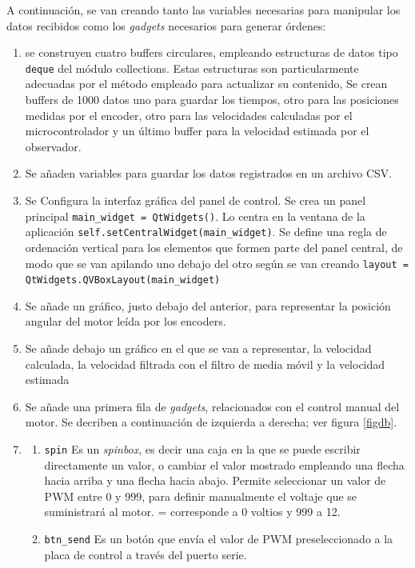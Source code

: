 A continuación, se van creando tanto las variables necesarias para manipular los datos recibidos como los \emph{gadgets} necesarios para generar órdenes:
\begin{enumerate}
    \item se construyen cuatro buffers circulares, empleando estructuras de datos tipo \texttt{deque} del módulo collections. Estas estructuras son particularmente adecuadas por el método empleado para actualizar su contenido, Se crean buffers de 1000 datos uno para guardar los tiempos, otro para las posiciones medidas por el encoder, otro para las velocidades calculadas por el microcontrolador y un último buffer para la velocidad estimada por el observador.

    \item Se añaden variables para guardar los datos registrados en un archivo CSV.
    \item Se Configura la interfaz gráfica del panel de control. Se crea un panel principal \texttt{main\_widget = QtWidgets()}. Lo centra en la ventana de la aplicación \texttt{self.setCentralWidget(main\_widget)}. Se define una regla de ordenación vertical para los elementos que formen parte del panel central, de modo que se van apilando uno debajo del otro según se van creando \texttt{layout = QtWidgets.QVBoxLayout(main\_widget)}
    \item Se añade un gráfico, justo debajo del anterior, para representar la posición angular del motor leída por los encoders.
    \item Se añade debajo un gráfico en el que se van a representar, la velocidad calculada, la velocidad filtrada con el filtro de media móvil y la velocidad estimada 
    \item Se añade una primera fila de \emph{gadgets}, relacionados con el control manual del motor. Se decriben a continuación de izquierda a derecha; ver figura \ref{figdb}.
    \item \begin{enumerate}
        \item \texttt{spin} Es un \emph{spinbox}, es decir una caja en la que se puede escribir directamente un valor, o cambiar el valor mostrado empleando una flecha hacia arriba y una flecha hacia abajo. Permite seleccionar un valor de PWM entre 0 y 999, para definir manualmente el voltaje que se suministrará al motor. = corresponde a 0 voltios y 999 a 12.
        \item \texttt{btn\_send} Es un botón que envía el valor de PWM preseleccionado a la placa de control a través del puerto serie.

\end{enumerate}
\end{enumerate}
